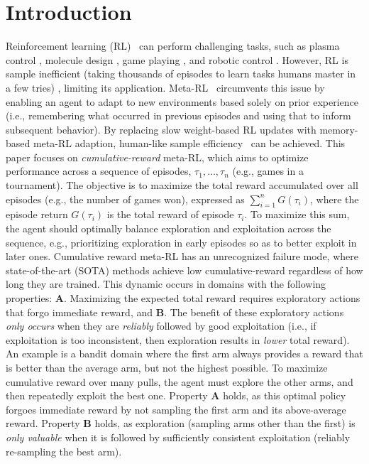 \documentclass{article}
\begin{document}
\section{Introduction}\label{intro}
Reinforcement learning (RL)~\citep{sutton_bach_barto_2018} can perform challenging tasks, such as plasma control \citep{plasma}, molecule design \citep{moleculedesign}, game playing \citep{alphago}, and robotic control \citep{openai2019rubiks}. However, RL is sample inefficient (taking thousands of episodes to learn tasks humans master in a few tries) \citep{mnih2013playing}, limiting its application. Meta-RL~\citep{VariBAD, rl2, rl2alt, hyperx, liu2021decoupling, adaptiveagentteam2023humantimescale} circumvents this issue by enabling an agent to adapt to new environments based solely on prior experience (i.e., remembering what occurred in previous episodes and using that to inform subsequent behavior). By replacing slow weight-based RL updates with memory-based meta-RL adaption, human-like sample efficiency~\citep{adaptiveagentteam2023humantimescale} can be achieved.
This paper focuses on \emph{cumulative-reward} meta-RL, which aims to optimize performance across a sequence of episodes,  \(\tau_1, \dots, \tau_n\) (e.g., games in a tournament). The objective is to maximize the total reward accumulated over all episodes (e.g., the number of games won), expressed as \(\sum_{i=1}^n G(\tau_i)\), where the episode return \(G(\tau_i)\) is the total reward of episode \(\tau_i\). To maximize this sum, the agent should optimally balance exploration and exploitation across the sequence, e.g., prioritizing exploration in early episodes so as to better exploit in later ones.
Cumulative reward meta-RL has an unrecognized failure mode, where state-of-the-art (SOTA) methods achieve low cumulative-reward regardless of how long they are trained. This dynamic occurs in domains with the following properties:
\textbf{A}. Maximizing the expected total reward requires exploratory actions that forgo immediate reward, and
\textbf{B}. The benefit of these exploratory actions \emph{only occurs} when they are \emph{reliably} followed by good exploitation (i.e., if exploitation is too inconsistent, then exploration results in \emph{lower} total reward).
An example is a bandit domain where the first arm always provides a reward that is better than the average arm, but not the highest possible. To maximize cumulative reward over many pulls, the agent must explore the other arms, and then repeatedly exploit the best one. Property \textbf{A} holds, as this optimal policy forgoes immediate reward by not sampling the first arm and its above-average reward. Property \textbf{B} holds, as exploration (sampling arms other than the first) is \emph{only valuable} when it is followed by sufficiently consistent exploitation (reliably re-sampling the best arm).
\end{document}
